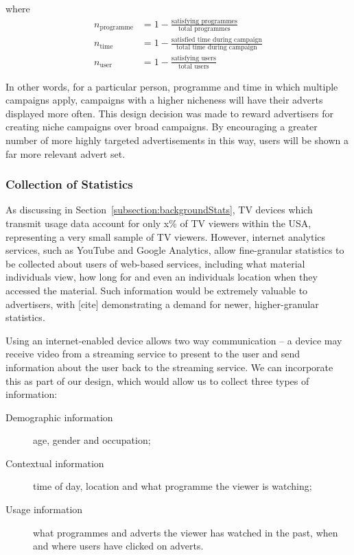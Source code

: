 where
\begin{align*}
	n_\text{programme} &= 1 - \frac{\text{satisfying programmes}}{\text{total programmes}} \\
	n_\text{time} &= 1 - \frac{\text{satisfied time during campaign}}{\text{total time during campaign}} \\
	n_\text{user} &= 1 - \frac{\text{satisfying users}}{\text{total users}}
\end{align*}

In other words, for a particular person, programme and time in which multiple campaigns apply, campaigns with a higher nicheness will have their adverts displayed more often. This design decision was made to reward advertisers for creating niche campaigns over broad campaigns. By encouraging a greater number of more highly targeted advertisements in this way, users will be shown a far more relevant advert set.


\subsubsection{Collection of Statistics}

As discussing in Section~\ref{subsection:backgroundStats}, TV devices which transmit usage data account for only x\% of TV viewers within the USA, representing a very small sample of TV viewers. However, internet analytics services, such as YouTube and Google Analytics, allow fine-granular statistics to be collected about users of web-based services, including what material individuals view, how long for and even an individuals location when they accessed the material. Such information would be extremely valuable to advertisers, with [cite] demonstrating a demand for newer, higher-granular statistics.

Using an internet-enabled device allows two way communication -- a device may receive video from a streaming service to present to the user and send information about the user back to the streaming service. We can incorporate this as part of our design, which would allow us to collect three types of information:
\begin{description}
\item[Demographic information] age, gender and occupation;
\item[Contextual information] time of day, location and what programme the viewer is watching;
\item[Usage information] what programmes and adverts the viewer has watched in the past, when and where users have clicked on adverts.
\end{description}


